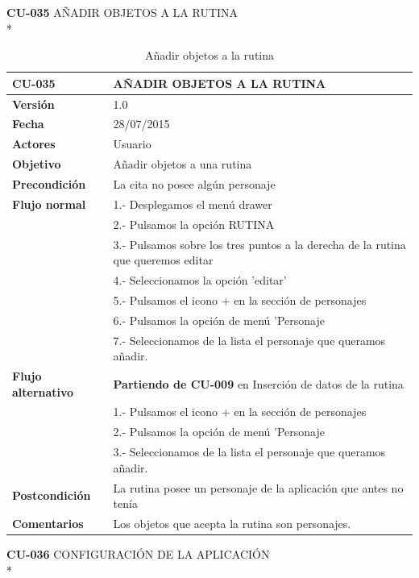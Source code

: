 \documentclass[../pfc.tex]{subfiles}
\begin{document}
	\clearpage
				
	\textbf{CU-035}	AÑADIR OBJETOS A LA RUTINA\\*

	\begin{table}[H]
		\centering
		\begin{tabular}[t]{|p{3cm}|p{9.5cm}|}
			\hline \textbf{CU-035} & \textbf{AÑADIR OBJETOS A LA RUTINA}\\*
			\hline\hline \textbf{Versión} & 1.0 \\*
			\hline\hline \textbf{Fecha} & 28/07/2015 \\*
			\hline\textbf{Actores} 	& Usuario\\*
			\hline \textbf{Objetivo} & Añadir objetos a una rutina\\* 			
			\hline \textbf{Precondición} & La cita no posee algún personaje\\* 
			\hline \textbf{Flujo normal} & 1.- Desplegamos el menú drawer \\* 
			& 2.- Pulsamos la opción RUTINA\\*	
			& 3.- Pulsamos sobre los tres puntos a la derecha de la rutina que queremos editar\\*	
			& 4.- Seleccionamos la opción 'editar'\\*	
			& 5.- Pulsamos el icono + en la sección de personajes\\*
			& 6.- Pulsamos la opción de menú 'Personaje\\*
			& 7.- Seleccionamos de la lista el personaje que queramos añadir.\\*
			\hline \textbf{Flujo alternativo} & \textbf{Partiendo de CU-009} en Inserción de datos de la rutina\\*  
			& 1.- Pulsamos el icono + en la sección de personajes\\*
			& 2.- Pulsamos la opción de menú 'Personaje\\*
			& 3.- Seleccionamos de la lista el personaje que queramos añadir.\\*
			\hline \textbf{Postcondición} & La rutina posee un personaje de la aplicación que antes no tenía\\* 
			\hline \textbf{Comentarios}   & Los objetos que acepta la rutina son personajes.\\*
			\hline
		\end{tabular}
		\caption{Añadir objetos a la rutina}
		\label{tabla:caso035}
	\end{table}
	
	
	\textbf{CU-036}	CONFIGURACIÓN DE LA APLICACIÓN\\*
\end{document}
